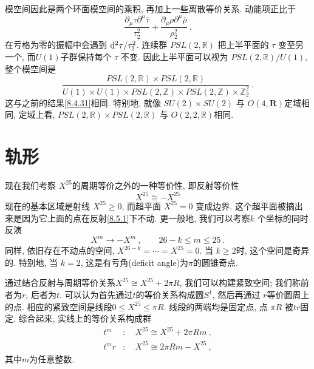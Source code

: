 模空间因此是两个环面模空间的乘积, 再加上一些离散等价关系. 动能项正比于
\begin{equation}
	\frac{\partial_{\mu} \tau \partial^{\mu} \bar{\tau}}{\tau_{2}^{2}}
	+\frac{\partial_{\mu} \rho \partial^{\mu} \bar{\rho}}{\rho_{2}^{2}} \:. \label{8.4.39}
\end{equation}
在亏格为零的振幅中会遇到 $\mathrm{d}^{2} \tau / \tau_{2}^{2}$. 连续群 $P S L(2, \mathds{R})$ 把上半平面的 $\tau$ 变至另一个, 
而$U(1)$子群保持每个 $\tau$ 不变. 因此上半平面可以视为 $P S L(2, \mathds{R}) / U(1)$, 整个模空间是
\begin{equation}
	\frac{P S L(2, \mathds{R}) \times P S L(2, \mathds{R})}{U(1) \times U(1) \times P S L(2, \mathds{Z}) \times P S L(2, \mathds{Z}) \times \mathds{Z}_{2}^{2}} \:. \label{8.4.40}
\end{equation}
这与之前的结果\eqref{8.4.31}相同. 特别地, 就像 $S U(2) \times S U(2)$ 与 $O(4, \mathbf{R})$定域相同, 定域上看, $P S L(2, \mathds{R}) \times P S L(2, \mathds{R})$ 与 $O(2,2, \mathds{R})$相同.


\section{轨形} \label{sec:8.5}%

现在我们考察 $X^{25}$的周期等价之外的一种等价性, 即反射等价性
\begin{equation}
	X^{25} \cong-X^{25} \label{8.5.1}
\end{equation}
现在的基本区域是射线 $X^{25} \geq 0$, 而超平面 $X^{25}=0$ 变成边界. 这个超平面被摘出来是因为它上面的点在反射\eqref{8.5.1}下不动. 
更一般地, 我们可以考察$k$ 个坐标的同时反演
\begin{equation}
	X^{m} \rightarrow-X^{m}\:, \qquad 26-k \leq m \leq 25 \:. \label{8.5.2}
\end{equation}
同样, 依旧存在不动点的空间,  $X^{26-k}=\cdots=X^{25}=0$. 当 $k \geq 2$时, 这个空间是奇异的. 
特别地, 当 $k=2$, 这是有亏角(deficit angle)为$\pi$的圆锥奇点.

通过结合反射与周期等价关系$X^{25} \cong X^{25}+2 \pi R $, 我们可以构建紧致空间; 我们称前者为$r$, 后者为$t$. 
可以认为首先通过$t$的等价关系构成圆$S^{1}$, 然后再通过 $r$等价圆周上的点. 相应的紧致空间是线段$0 \leq X^{25} \leq \pi R$. 
线段的两端均是固定点, 点 $\pi R$ 被$tr$固定. 综合起来, 实线上的等价关系构成群
\begin{subequations} \label{8.5.3}
\begin{align}
		t^{m}  &: \quad X^{25} \cong X^{25}+2 \pi R m  \:, \label{8.5.3a} \\	
		t^{m} r&: \quad  X^{25} \cong 2 \pi R m-X^{25} \:, \label{8.5.3b}
\end{align}
\end{subequations}
其中$m$为任意整数.

